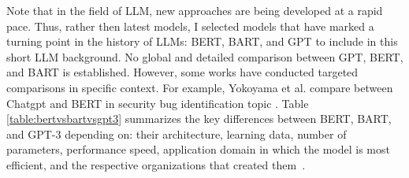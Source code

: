 Note that in the field of LLM, new approaches are being developed at a rapid pace. Thus, rather then latest models, I selected models that have marked a turning point in the history of LLMs: BERT, BART, and GPT to include in this short LLM background. No global and detailed comparison between GPT, BERT, and BART is established. However, some works have conducted targeted comparisons in specific context. For example, Yokoyama et al. compare between Chatgpt and BERT in security bug identification topic \cite{10685583}. Table \ref{table:bertvsbartvsgpt3} summarizes the key differences between BERT, BART, and GPT-3 depending on: their architecture, learning data, number of parameters, performance speed, application domain in which the model is most efficient, and the respective organizations that created them~\cite{DBLP:journals/corr/abs-2302-09419,lewis2019bartdenoisingsequencetosequencepretraining}.




